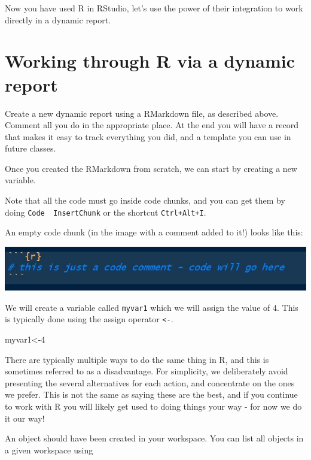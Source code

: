 \documentclass[
]{article}
\newenvironment{Shaded}{\begin{snugshade}}{\end{snugshade}}
\newcommand{\DecValTok}[1]{\textcolor[rgb]{0.00,0.00,0.81}{#1}}
\newcommand{\NormalTok}[1]{#1}
\newcommand{\OtherTok}[1]{\textcolor[rgb]{0.56,0.35,0.01}{#1}}
\begin{document}
Now you have used R in RStudio, let's use the power of their integration
to work directly in a dynamic report.

\section{Working through R via a dynamic
report}\label{working-through-r-via-a-dynamic-report}

Create a new dynamic report using a RMarkdown file, as described above.
Comment all you do in the appropriate place. At the end you will have a
record that makes it easy to track everything you did, and a template
you can use in future classes.

Once you created the RMarkdown from scratch, we can start by creating a
new variable.

Note that all the code must go inside code chunks, and you can get them
by doing \texttt{Code\ \textbar{}\ InsertChunk} or the shortcut
\texttt{Ctrl+Alt+I}.

An empty code chunk (in the image with a comment added to it!) looks
like this:

\includegraphics{codechunk.JPG}

We will create a variable called \texttt{myvar1} which we will assign
the value of 4. This is typically done using the assign operator
\texttt{\textless{}-}.

\begin{Shaded}
\begin{Highlighting}[]
\NormalTok{myvar1}\OtherTok{\textless{}{-}}\DecValTok{4}
\end{Highlighting}
\end{Shaded}

There are typically multiple ways to do the same thing in R, and this is
sometimes referred to as a disadvantage. For simplicity, we deliberately
avoid presenting the several alternatives for each action, and
concentrate on the ones we prefer. This is not the same as saying these
are the best, and if you continue to work with R you will likely get
used to doing things your way - for now we do it our way!

An object should have been created in your workspace. You can list all
objects in a given workspace using
\end{document}
